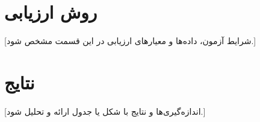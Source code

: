 \section{روش ارزیابی}
[شرایط آزمون، داده‌ها و معیارهای ارزیابی در این قسمت مشخص شود.]

\section{نتایج}
[اندازه‌گیری‌ها و نتایج با شکل یا جدول ارائه و تحلیل شود.]
